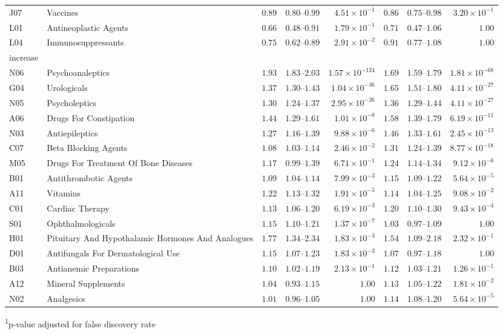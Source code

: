 \begin{longtable}{llrrrrrr}
J07 & Vaccines & $0.89$ & $0.80$–$0.99$ & $4.51 \times 10^{-1}$ & $0.86$ & $0.75$–$0.98$ & $3.20 \times 10^{-1}$ \\ 
L01 & Antineoplastic Agents & $0.66$ & $0.48$–$0.91$ & $1.79 \times 10^{-1}$ & $0.71$ & $0.47$–$1.06$ & $1.00$ \\ 
L04 & Immunosuppressants & $0.75$ & $0.62$–$0.89$ & $2.91 \times 10^{-2}$ & $0.91$ & $0.77$–$1.08$ & $1.00$ \\ 
\midrule
\multicolumn{1}{l}{increase} \\ 
\midrule
N06 & Psychoanaleptics & $1.93$ & $1.83$–$2.03$ & $1.57 \times 10^{-124}$ & $1.69$ & $1.59$–$1.79$ & $1.81 \times 10^{-68}$ \\ 
G04 & Urologicals & $1.37$ & $1.30$–$1.43$ & $1.04 \times 10^{-36}$ & $1.65$ & $1.51$–$1.80$ & $4.11 \times 10^{-27}$ \\ 
N05 & Psycholeptics & $1.30$ & $1.24$–$1.37$ & $2.95 \times 10^{-26}$ & $1.36$ & $1.29$–$1.44$ & $4.11 \times 10^{-27}$ \\ 
A06 & Drugs For Constipation & $1.44$ & $1.29$–$1.61$ & $1.01 \times 10^{-8}$ & $1.58$ & $1.39$–$1.79$ & $6.19 \times 10^{-11}$ \\ 
N03 & Antiepileptics & $1.27$ & $1.16$–$1.39$ & $9.88 \times 10^{-6}$ & $1.46$ & $1.33$–$1.61$ & $2.45 \times 10^{-13}$ \\ 
C07 & Beta Blocking Agents & $1.08$ & $1.03$–$1.14$ & $2.46 \times 10^{-2}$ & $1.31$ & $1.24$–$1.39$ & $8.77 \times 10^{-18}$ \\ 
M05 & Drugs For Treatment Of Bone Diseases & $1.17$ & $0.99$–$1.39$ & $6.71 \times 10^{-1}$ & $1.24$ & $1.14$–$1.34$ & $9.12 \times 10^{-6}$ \\ 
B01 & Antithrombotic Agents & $1.09$ & $1.04$–$1.14$ & $7.99 \times 10^{-3}$ & $1.15$ & $1.09$–$1.22$ & $5.64 \times 10^{-5}$ \\ 
A11 & Vitamins & $1.22$ & $1.13$–$1.32$ & $1.91 \times 10^{-5}$ & $1.14$ & $1.04$–$1.25$ & $9.08 \times 10^{-2}$ \\ 
C01 & Cardiac Therapy & $1.13$ & $1.06$–$1.20$ & $6.19 \times 10^{-3}$ & $1.20$ & $1.10$–$1.30$ & $9.43 \times 10^{-4}$ \\ 
S01 & Ophthalmologicals & $1.15$ & $1.10$–$1.21$ & $1.37 \times 10^{-7}$ & $1.03$ & $0.97$–$1.09$ & $1.00$ \\ 
H01 & Pituitary And Hypothalamic Hormones And Analogues & $1.77$ & $1.34$–$2.34$ & $1.83 \times 10^{-3}$ & $1.54$ & $1.09$–$2.18$ & $2.32 \times 10^{-1}$ \\ 
D01 & Antifungals For Dermatological Use & $1.15$ & $1.07$–$1.23$ & $1.83 \times 10^{-3}$ & $1.07$ & $0.97$–$1.18$ & $1.00$ \\ 
B03 & Antianemic Preparations & $1.10$ & $1.02$–$1.19$ & $2.13 \times 10^{-1}$ & $1.12$ & $1.03$–$1.21$ & $1.26 \times 10^{-1}$ \\ 
A12 & Mineral Supplements & $1.04$ & $0.93$–$1.15$ & $1.00$ & $1.13$ & $1.05$–$1.22$ & $1.81 \times 10^{-2}$ \\ 
N02 & Analgesics & $1.01$ & $0.96$–$1.05$ & $1.00$ & $1.14$ & $1.08$–$1.20$ & $5.64 \times 10^{-5}$ \\ 
\bottomrule
\end{longtable}
\begin{minipage}{\linewidth}
\textsuperscript{1}p-value adjusted for false discovery rate\\
\end{minipage}

